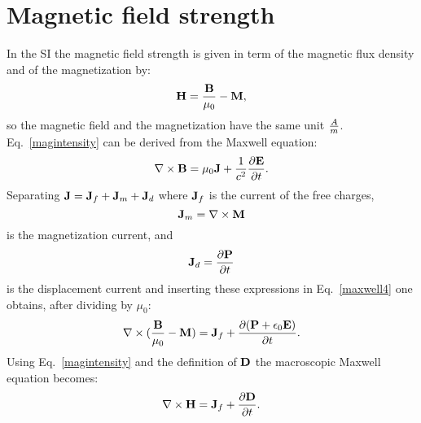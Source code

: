 \documentclass[12pt,a4paper]{article}
\begin{document}
\section{\color{coral}Magnetic field strength}
In the SI the magnetic field strength is given in term of the
magnetic flux density and of the magnetization by:
\begin{equation}
{\bf H}={{\bf B} \over \mu_0} - {\bf M},
\label{magintensity}
\end{equation}
so the magnetic field and the magnetization have the same
unit ${A \over m}$.\\
Eq.~\ref{magintensity} can be derived from the Maxwell equation:
\begin{equation}
\nabla \times {\bf B}= \mu_0 {\bf J} + {1\over c^2} {\partial {\bf E} \over
\partial t}.
\label{maxwell4}
\end{equation}
Separating ${\bf J}={\bf J}_f + {\bf J}_m + {\bf J}_d$ where
${\bf J}_f$ is the current of the free charges, 
\begin{equation}
{\bf J}_m=\nabla \times {\bf M}
\end{equation}
is the magnetization current, and
\begin{equation}
{\bf J}_d={\partial {\bf P} \over \partial t}
\end{equation}
is the displacement current and inserting these expressions in 
Eq.~\ref{maxwell4} one obtains, after dividing by $\mu_0$:
\begin{equation}
\nabla \times ({{\bf B}\over \mu_0}-{\bf M})= {\bf J}_f + 
{\partial ({\bf P} + \epsilon_0 {\bf E} )\over
\partial t}.
\end{equation}
Using Eq.~\ref{magintensity} and the definition of ${\bf D}$ the
macroscopic Maxwell equation becomes:
\begin{equation}
\nabla \times {\bf H}= {\bf J}_f + 
{\partial {\bf D}\over
\partial t}.
\end{equation}
\\
\end{document}
